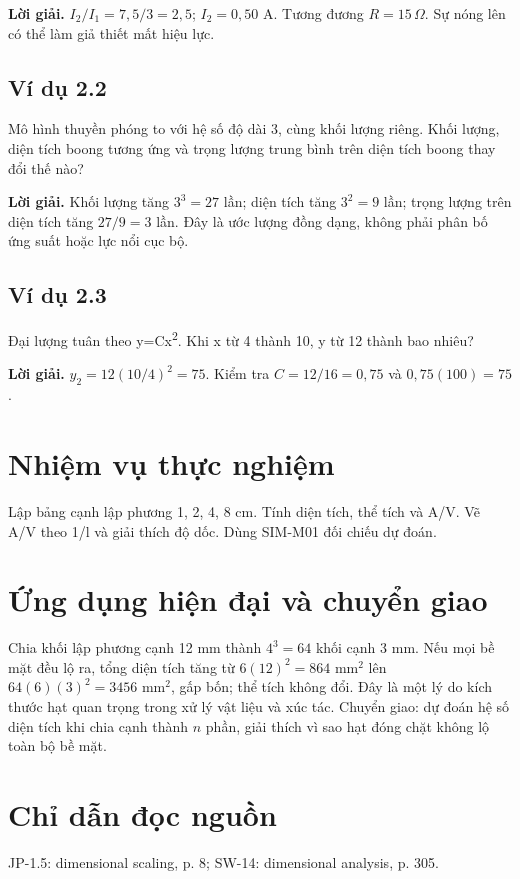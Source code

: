 \documentclass[11pt,a4paper,openany]{book}
\begin{document}
\textbf{Lời giải.} $I_2/I_1=7{,}5/3=2{,}5$; $I_2=0{,}50$ A. Tương đương $R=15\,\Omega$. Sự nóng lên có thể làm giả thiết mất hiệu lực.
\subsection*{Ví dụ 2.2}
Mô hình thuyền phóng to với hệ số độ dài 3, cùng khối lượng riêng. Khối lượng, diện tích boong tương ứng và trọng lượng trung bình trên diện tích boong thay đổi thế nào?

\textbf{Lời giải.} Khối lượng tăng $3^3=27$ lần; diện tích tăng $3^2=9$ lần; trọng lượng trên diện tích tăng $27/9=3$ lần. Đây là ước lượng đồng dạng, không phải phân bố ứng suất hoặc lực nổi cục bộ.
\subsection*{Ví dụ 2.3}
Đại lượng tuân theo y=Cx\textsuperscript{2}. Khi x từ 4 thành 10, y từ 12 thành bao nhiêu?

\textbf{Lời giải.} $y_2=12(10/4)^2=75$. Kiểm tra $C=12/16=0{,}75$ và $0{,}75(100)=75$.
\section{Nhiệm vụ thực nghiệm}
Lập bảng cạnh lập phương 1, 2, 4, 8 cm. Tính diện tích, thể tích và A/V. Vẽ A/V theo 1/l và giải thích độ dốc. Dùng SIM-M01 đối chiếu dự đoán.
\section{Ứng dụng hiện đại và chuyển giao}
Chia khối lập phương cạnh 12 mm thành $4^3=64$ khối cạnh 3 mm. Nếu mọi bề mặt đều lộ ra, tổng diện tích tăng từ $6(12)^2=864$ mm$^2$ lên $64(6)(3)^2=3456$ mm$^2$, gấp bốn; thể tích không đổi. Đây là một lý do kích thước hạt quan trọng trong xử lý vật liệu và xúc tác. Chuyển giao: dự đoán hệ số diện tích khi chia cạnh thành $n$ phần, giải thích vì sao hạt đóng chặt không lộ toàn bộ bề mặt.
\section{Chỉ dẫn đọc nguồn}
JP-1.5: dimensional scaling, p. 8; SW-14: dimensional analysis, p. 305.
\end{document}
